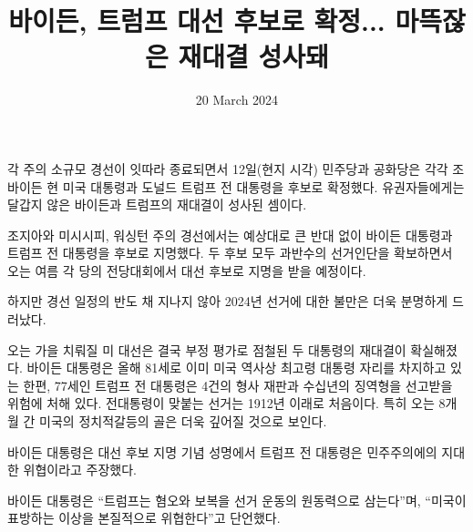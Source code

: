 \documentclass{translation}
\date{20 March 2024}
\title{바이든, 트럼프 대선 후보로 확정... 마뜩잖은 재대결 성사돼}
\begin{document}
각 주의 소규모 경선이 잇따라 종료되면서 12일(현지 시각) 민주당과 공화당은 각각 조 바이든 현 미국 대통령과 도널드 트럼프 전 대통령을 후보로 확정했다.
유권자들에게는 달갑지 않은 바이든과 트럼프의 재대결이 성사된 셈이다.

조지아와 미시시피, 워싱턴 주의 경선에서는 예상대로
큰 반대 없이 바이든 대통령과 트럼프 전 대통령을 후보로 지명했다.
두 후보 모두 과반수의 선거인단을 확보하면서 오는 여름 각 당의 전당대회에서 대선 후보로 지명을 받을 예정이다.

하지만 경선 일정의 반도 채 지나지 않아 2024년 선거에 대한 불만은 더욱 분명하게 드러났다.

오는 가을 치뤄질 미 대선은 결국 부정 평가로 점철된 두 대통령의 재대결이 확실해졌다.
바이든 대통령은 올해 81세로 이미 미국 역사상 최고령 대통령 자리를 차지하고 있는 한편, 77세인 트럼프 전 대통령은 4건의 형사 재판과 수십년의 징역형을 선고받을 위험에 처해 있다.
전 대통령이 맞붙는 선거는 1912년 이래로 처음이다. 특히 오는 8개월 간 미국의 정치적 갈등의 골은 더욱 깊어질 것으로 보인다.

바이든 대통령은 대선 후보 지명 기념 성명에서 트럼프 전 대통령은 민주주의에의 지대한 위협이라고 주장했다.

바이든 대통령은 ``트럼프는 혐오와 보복을 선거 운동의 원동력으로 삼는다''며, ``미국이 표방하는 이상을 본질적으로 위협한다''고 단언했다.
\end{document}
